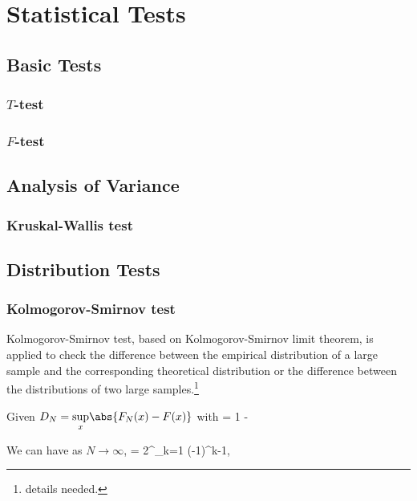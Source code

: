 \chapter{Statistical Tests}

\section{Basic Tests}

\subsection{$T$-test}

\subsection{$F$-test}

\section{Analysis of Variance}

\subsection{Kruskal-Wallis test}

\section{Distribution Tests}

\subsection{Kolmogorov-Smirnov test}

Kolmogorov-Smirnov test, based on Kolmogorov-Smirnov limit theorem, is applied to check the difference between the empirical distribution of a large sample and the corresponding theoretical distribution or the difference
between the distributions of two large samples.\footnote{details needed.}


Given $D_N = \underset{x}{\sup}\abs{F_N(x) - F(x)}$ with
\be
\pro{} = 1 -\alpha
\ee

We can have as $N\to \infty$,
\be
\alpha = 2\sum^\infty_{k=1} (-1)^{k-1}\exp{},
\ee

